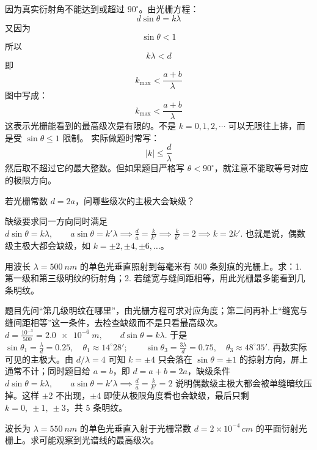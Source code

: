 \documentclass[lang=cn,11pt]{elegantbook}
\begin{document}
\begin{theorem}[屏上可观察的最高级次]
因为真实衍射角不能达到或超过 \(90^\circ\)。由光栅方程：
\[
d\sin\theta=k\lambda
\]又因为
\[
\sin\theta<1
\]所以
\[
k\lambda<d
\]即
\[
k_{\max}<\frac{a+b}{\lambda}
\]图中写成：
\[
k_{\max}<\frac{a+b}{\lambda}
\]这表示光栅能看到的最高级次是有限的。不是 \(k=0,1,2,\cdots\) 可以无限往上排，而是受 \(\sin\theta\le 1\) 限制。
实际做题时常写：
\[
|k|\le \frac{d}{\lambda}
\]然后取不超过它的最大整数。但如果题目严格写 \(\theta<90^\circ\)，就注意不能取等号对应的极限方向。
\end{theorem}

\begin{exercise}[缺级判断]
若光栅常数 \(d=2a\)，问哪些级次的主极大会缺级？
\end{exercise}

\begin{solution}
缺级要求同一方向同时满足
 \(d\sin\theta=k\lambda,\qquad a\sin\theta=k'\lambda \implies \frac{d}{a}=\frac{k}{k'} \implies \frac{k}{k'}=2 \implies k=2k'.\) 
也就是说，偶数级主极大都会缺级，如 \(k=\pm2,\pm4,\pm6,\dots\)。
\end{solution}

\begin{exercise}
用波长 \(\lambda=\SI{500}{nm}\) 的单色光垂直照射到每毫米有 500 条刻痕的光栅上。求：1. 第一级和第三级明纹的衍射角；2. 若缝宽与缝间距相等，用此光栅最多能看到几条明纹。
\end{exercise}

\begin{solution}
题目先问“第几级明纹在哪里”，由光栅方程可求对应角度；第二问再补上“缝宽与缝间距相等”这一条件，去检查缺级而不是只看最高级次。
 \(d=\frac{10^{-3}}{500}=\SI{2.0e-6}{m},\qquad d\sin\theta=k\lambda.\) 
于是
 \(\sin\theta_1=\frac{\lambda}{d}=0.25,\quad \theta_1\approx14^\circ 28';\qquad \sin\theta_3=\frac{3\lambda}{d}=0.75,\quad \theta_3\approx48^\circ 35'.\) 
再数实际可见的主极大。由 \(d/\lambda=4\) 可知 \(k=\pm4\) 只会落在 \(\sin\theta=\pm1\) 的掠射方向，屏上通常不计；同时题目给 \(a=b\)，即 \(d=a+b=2a\)，缺级条件
 \(d\sin\theta=k\lambda,\qquad a\sin\theta=k'\lambda \implies \frac{d}{a}=\frac{k}{k'}=2\) 
说明偶数级主极大都会被单缝暗纹压掉。这样 \(\pm2\) 不出现，\(\pm4\) 即使从极限角度看也会缺级，最后只剩 \(k=0,\ \pm1,\ \pm3\)，共 5 条明纹。
\end{solution}

\begin{exercise}
波长为 \(\lambda=\SI{550}{nm}\) 的单色光垂直入射于光栅常数 \(d=2\times10^{-4}\,\si{cm}\) 的平面衍射光栅上。求可能观察到光谱线的最高级次。
\end{exercise}
\end{document}
